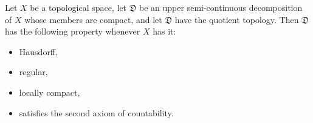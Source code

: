 Let $X$ be a topological space, let $\mathfrak{D}$ be an upper semi-continuous decomposition of $X$ whose members are compact, and let $\mathfrak{D}$ have the quotient topology. Then $\mathfrak{D}$ has the following property whenever $X$ has it:

\begin{itemize}
\item Hausdorff,
\item regular,
\item locally compact,
\item satisfies the second axiom of countability.
\end{itemize}
